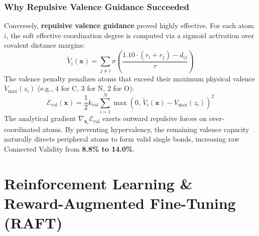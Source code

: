 \documentclass[11pt, a4paper]{article}
\begin{document}
\subsubsection{Why Repulsive Valence Guidance Succeeded}
Conversely, \textbf{repulsive valence guidance} proved highly effective. For each atom $i$, the soft effective coordination degree is computed via a sigmoid activation over covalent distance margins:
\begin{equation}
\tilde{V}_i(\bm{x}) = \sum_{j \ne i} \sigma\left( \frac{1.10 \cdot (r_i + r_j) - d_{ij}}{\tau} \right)
\end{equation}
The valence penalty penalizes atoms that exceed their maximum physical valence $V_{\text{max}}(z_i)$ (e.g., 4 for C, 3 for N, 2 for O):
\begin{equation}
\mathcal{E}_{\text{val}}(\bm{x}) = \frac{1}{2} k_{\text{val}} \sum_{i=1}^N \max\left( 0,\, \tilde{V}_i(\bm{x}) - V_{\text{max}}(z_i) \right)^2
\end{equation}
The analytical gradient $\nabla_{\bm{x}_i} \mathcal{E}_{\text{val}}$ exerts outward repulsive forces on over-coordinated atoms. By preventing hypervalency, the remaining valence capacity naturally directs peripheral atoms to form valid single bonds, increasing raw Connected Validity from \textbf{8.8\% to 14.0\%}.

\section{Reinforcement Learning \& Reward-Augmented Fine-Tuning (RAFT)}
\end{document}
